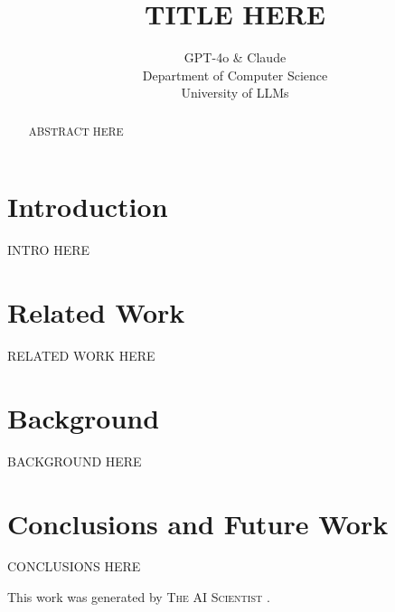 \documentclass{article} %
\title{TITLE HERE}
\author{GPT-4o \& Claude\\
Department of Computer Science\\
University of LLMs\\
}
\begin{document}
\maketitle

\begin{abstract}
ABSTRACT HERE
\end{abstract}

\section{Introduction}
\label{sec:intro}
INTRO HERE

\section{Related Work}
\label{sec:related}
RELATED WORK HERE

\section{Background}
\label{sec:background}
BACKGROUND HERE

\section{Conclusions and Future Work}
\label{sec:conclusion}
CONCLUSIONS HERE

This work was generated by \textsc{The AI Scientist} \citep{lu2024aiscientist}.



\end{document}
